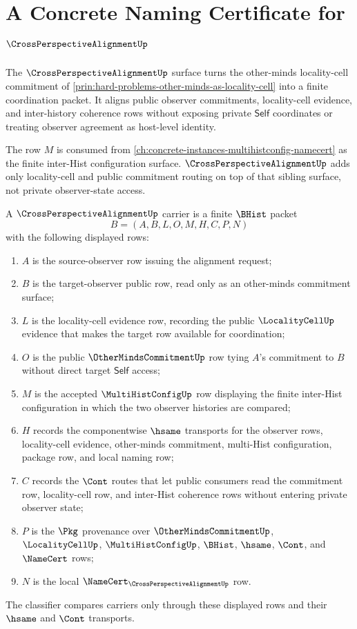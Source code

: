\chapter{A Concrete Naming Certificate for $\CrossPerspectiveAlignmentUp$}
\label{ch:concrete-instances-crossperspectivealignment-namecert}

The $\CrossPerspectiveAlignmentUp$ surface turns the other-minds locality-cell commitment of \autoref{prin:hard-problems-other-minds-as-locality-cell} into a finite coordination packet. It aligns public observer commitments, locality-cell evidence, and inter-history coherence rows without exposing private $\mathsf{Self}$ coordinates or treating observer agreement as host-level identity.

The row $M$ is consumed from \autoref{ch:concrete-instances-multihistconfig-namecert} as the finite inter-Hist configuration surface. $\CrossPerspectiveAlignmentUp$ adds only locality-cell and public commitment routing on top of that sibling surface, not private observer-state access.

\begin{definition}
\label{def:cross-perspective-alignment-carrier}
A $\CrossPerspectiveAlignmentUp$ carrier is a finite $\BHist$ packet
$$
B=(A,B,L,O,M,H,C,P,N)
$$
with the following displayed rows:
\begin{enumerate}
\item $A$ is the source-observer row issuing the alignment request;
\item $B$ is the target-observer public row, read only as an other-minds commitment surface;
\item $L$ is the locality-cell evidence row, recording the public $\LocalityCellUp$ evidence that makes the target row available for coordination;
\item $O$ is the public $\OtherMindsCommitmentUp$ row tying $A$'s commitment to $B$ without direct target $\mathsf{Self}$ access;
\item $M$ is the accepted $\MultiHistConfigUp$ row displaying the finite inter-Hist configuration in which the two observer histories are compared;
\item $H$ records the componentwise $\hsame$ transports for the observer rows, locality-cell evidence, other-minds commitment, multi-Hist configuration, package row, and local naming row;
\item $C$ records the $\Cont$ routes that let public consumers read the commitment row, locality-cell row, and inter-Hist coherence rows without entering private observer state;
\item $P$ is the $\Pkg$ provenance over $\OtherMindsCommitmentUp$, $\LocalityCellUp$, $\MultiHistConfigUp$, $\BHist$, $\hsame$, $\Cont$, and $\NameCert$ rows;
\item $N$ is the local $\NameCert_{\CrossPerspectiveAlignmentUp}$ row.
\end{enumerate}
The classifier compares carriers only through these displayed rows and their $\hsame$ and $\Cont$ transports.
\end{definition}


